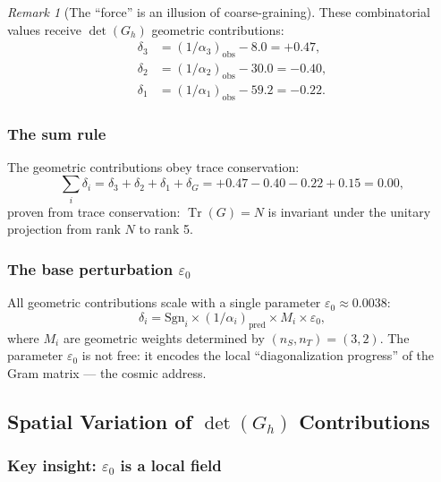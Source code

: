 \documentclass[12pt]{article}
\theoremstyle{remark}
\newtheorem{remark}[theorem]{Remark}
\theoremstyle{definition}
\newcommand{\tr}{\operatorname{Tr}}
\begin{document}
\begin{remark}[The ``force'' is an illusion of coarse-graining]
These combinatorial values receive $\det(G_h)$ geometric contributions:
\begin{align}
\delta_3 &= (1/\alpha_3)_\text{obs} - 8.0 = +0.47, \\
\delta_2 &= (1/\alpha_2)_\text{obs} - 30.0 = -0.40, \\
\delta_1 &= (1/\alpha_1)_\text{obs} - 59.2 = -0.22.
\end{align}

\subsubsection{The sum rule}

The geometric contributions obey trace conservation:
\begin{equation}
\sum_i \delta_i = \delta_3 + \delta_2 + \delta_1 + \delta_G = +0.47 - 0.40 - 0.22 + 0.15 = 0.00,
\end{equation}
proven from trace conservation: $\tr(G) = N$ is invariant under the unitary projection from rank $N$ to rank 5.

\subsubsection{The base perturbation $\varepsilon_0$}

All geometric contributions scale with a single parameter $\varepsilon_0 \approx 0.0038$:
\begin{equation}
\delta_i = \text{Sgn}_i \times (1/\alpha_i)_\text{pred} \times M_i \times \varepsilon_0,
\end{equation}
where $M_i$ are geometric weights determined by $(n_S, n_T) = (3, 2)$. The parameter $\varepsilon_0$ is not free: it encodes the local ``diagonalization progress'' of the Gram matrix --- the cosmic address.

\subsection{Spatial Variation of $\det(G_h)$ Contributions}

\subsubsection{Key insight: $\varepsilon_0$ is a local field}


\end{remark}
\end{document}
